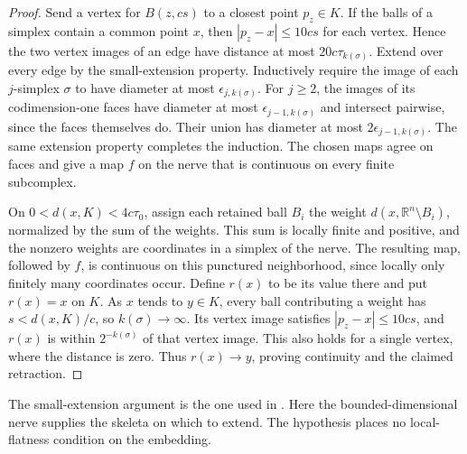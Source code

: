 \documentclass[11pt,oneside,openany]{book}
\theoremstyle{plain}
\theoremstyle{definition}
\theoremstyle{remark}
\newcommand{\R}{\mathbb R}
\begin{document}
\begin{proof}
Send a vertex for \(B(z,cs)\) to a closest point \(p_z\in K\).
If the balls of a simplex contain a common point \(x\), then
\(|p_z-x|\le10cs\) for each vertex. Hence the two vertex images
of an edge have distance at most \(20c\tau_{k(\sigma)}\).
Extend over every edge by the small-extension property.
Inductively require the image of each \(j\)-simplex \(\sigma\)
to have diameter at most \(\epsilon_{j,k(\sigma)}\).
For \(j\ge2\), the images of its codimension-one faces have
diameter at most \(\epsilon_{j-1,k(\sigma)}\) and intersect
pairwise, since the faces themselves do. Their union has
diameter at most \(2\epsilon_{j-1,k(\sigma)}\).
The same extension property completes the induction.
The chosen maps agree on faces and give a map \(f\) on the nerve
that is continuous on every finite subcomplex.

On \(0<d(x,K)<4c\tau_0\), assign each retained ball \(B_i\)
the weight \(d(x,\R^n\setminus B_i)\), normalized by the sum of
the weights. This sum is locally finite and positive, and the
nonzero weights are coordinates in a simplex of the nerve.
The resulting map, followed by \(f\), is continuous on this
punctured neighborhood, since locally only finitely many
coordinates occur. Define \(r(x)\) to be its value there and
put \(r(x)=x\) on \(K\). As \(x\) tends to \(y\in K\), every
ball contributing a weight has \(s<d(x,K)/c\), so
\(k(\sigma)\to\infty\). Its vertex image satisfies
\(|p_z-x|\le10cs\), and \(r(x)\) is within \(2^{-k(\sigma)}\)
of that vertex image. This also holds for a single vertex,
where the distance is zero. Thus \(r(x)\to y\), proving
continuity and the claimed retraction.
\end{proof}

The small-extension argument is the one used in
\cite[Appendix, Theorem A.7]{Hatcher}. Here the bounded-dimensional
nerve supplies the skeleta on which to extend. The hypothesis
places no local-flatness condition on the embedding.
\end{document}
